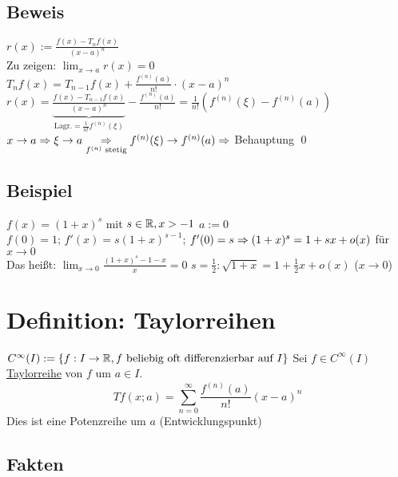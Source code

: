 \subsection*{Beweis}
$r(x) := \frac{f(x)-T_n f(x)}{(x-a)^n}$\\
Zu zeigen: $\lim_{x \to a} r(x) = 0$\\
$T_n f(x) = T_{n-1} f(x) + \frac{f^{(n)}(a)}{n!} \cdot (x-a)^n$\\
$r(x) = \underbrace{\frac{f(x) - T_{n-1} f(x)}{(x-a)^n}}_{\text{Lagr.}=\frac{1}{n!} f^{(n)}(\xi)} - \frac{f^{(n)}(a)}{n!} = \frac{1}{n!}(f^{(n)}(\xi) - f^{(n)}(a))$\\
$x \to a \Rightarrow \xi \to a \underset{f^{(n)} \text{ stetig}}{\Rightarrow} f^{(n)}(\xi) \to f^{(n)}(a) \Rightarrow$ Behauptung \qed


\subsection*{Beispiel}
$f(x)=(1+x)^s$ mit $s \in \mathbb{R}, x > -1$\nl
$a := 0$\\
$f(0)=1$; $f'(x) = s(1+x)^{s-1}$; $f'(0) = s \Rightarrow (1+x)^s = 1+sx+o(x)$ für $x \to 0$\\
Das heißt: $\lim_{x \to 0} \frac{(1+x)^s-1-x}{x} = 0$\nl
$s = \frac{1}{2}: \sqrt{1+x} = 1+\frac{1}{2}x+o(x)$ ($x \to 0$)

\section{Definition: Taylorreihen}\label{15.6}
$C^\infty(I) := \{f: I \to \mathbb{R}, f \text{ beliebig oft differenzierbar auf } I\}$\nl
Sei $f \in C^\infty(I)$ \underline{Taylorreihe} von $f$ um $a \in I$.
$$T f(x;a) = \sum_{n=0}^\infty \frac{f^{(n)}(a)}{n!} (x-a)^n$$
Dies ist eine Potenzreihe um $a$ (Entwicklungspunkt)

\newpage

\subsection*{Fakten}

